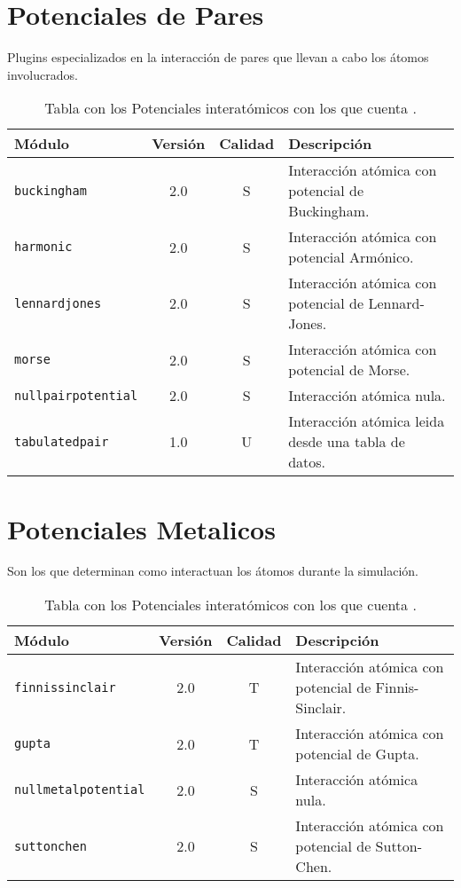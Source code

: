 \section{Potenciales de Pares}
Plugins especializados en la interacci\'on de pares que llevan a cabo los \'atomos involucrados.

\begin{table}[h!]\centering
 \begin{tabular}{|l|c|c|p{10cm}|}\hline
 M\'odulo & Versi\'on & Calidad & Descripci\'on \\
 \hline\hline
 \texttt{buckingham} & 2.0 & S & Interacci\'on at\'omica con potencial de Buckingham.\\
 \hline
 \texttt{harmonic} & 2.0 & S & Interacci\'on at\'omica con potencial Arm\'onico.\\
 \hline
 \texttt{lennardjones} & 2.0 & S & Interacci\'on at\'omica con potencial de Lennard-Jones.\\
 \hline
 \texttt{morse} & 2.0 & S & Interacci\'on at\'omica con potencial de Morse.\\
 \hline
 \texttt{nullpairpotential} & 2.0 & S & Interacci\'on at\'omica nula.\\
 \hline
\texttt{tabulatedpair} & 1.0 & U & Interacci\'on at\'omica leida desde una tabla de datos.\\
 \hline
 \end{tabular}
\label{tab:modpotentials}
\caption{Tabla con los Potenciales interat\'omicos con los que cuenta {\lpmd}.}
\end{table}

\section{Potenciales Metalicos}
Son los que determinan como interactuan los \'atomos durante la simulaci\'on.

\begin{table}[h!]\centering
 \begin{tabular}{|l|c|c|p{10cm}|}\hline
 M\'odulo & Versi\'on & Calidad & Descripci\'on \\
 \hline\hline
 \texttt{finnissinclair} & 2.0 & T & Interacci\'on at\'omica con potencial de Finnis-Sinclair.\\
 \hline
 \texttt{gupta} & 2.0 & T & Interacci\'on at\'omica con potencial de Gupta.\\
 \hline
 \texttt{nullmetalpotential} & 2.0 & S & Interacci\'on at\'omica nula.\\
 \hline
 \texttt{suttonchen} & 2.0 & S & Interacci\'on at\'omica con potencial de Sutton-Chen.\\
 \hline
 \end{tabular}
\label{tab:modmetalpotentials}
\caption{Tabla con los Potenciales interat\'omicos con los que cuenta {\lpmd}.}
\end{table}


